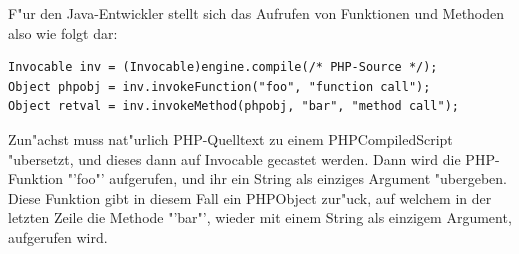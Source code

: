 F"ur den Java-Entwickler stellt sich das Aufrufen von Funktionen und Methoden also wie folgt dar:

\begin{lstlisting}[caption=Aufrufen von PHP-Funktionen und -Methoden]
Invocable inv = (Invocable)engine.compile(/* PHP-Source */);
Object phpobj = inv.invokeFunction("foo", "function call");
Object retval = inv.invokeMethod(phpobj, "bar", "method call");
\end{lstlisting}

Zun"achst muss nat"urlich PHP-Quelltext zu einem PHPCompiledScript "ubersetzt, und dieses dann auf Invocable gecastet werden. Dann wird die PHP-Funktion "'foo"'
aufgerufen, und ihr ein String als einziges Argument "ubergeben. Diese Funktion gibt in diesem Fall ein PHPObject zur"uck, auf welchem in der letzten Zeile
die Methode "'bar"', wieder mit einem String als einzigem Argument, aufgerufen wird.

